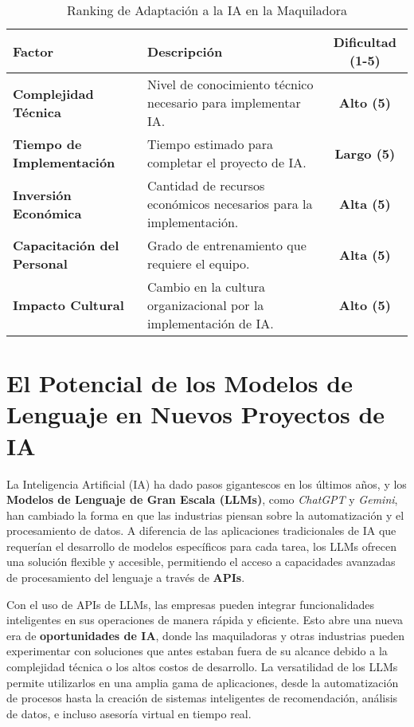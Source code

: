 \begin{table}[htbp]
\centering
\caption{Ranking de Adaptación a la IA en la Maquiladora}
\label{tab:ranking-adaptacion}
\begin{tabularx}{\textwidth}{|X|X|c|}
\hline
\textbf{Factor} & \textbf{Descripción} & \textbf{Dificultad (1-5)} \\
\hline
\textbf{Complejidad Técnica} & Nivel de conocimiento técnico necesario para implementar IA. & \textbf{Alto (5)} \\
\hline
\textbf{Tiempo de Implementación} & Tiempo estimado para completar el proyecto de IA. & \textbf{Largo (5)} \\
\hline
\textbf{Inversión Económica} & Cantidad de recursos económicos necesarios para la implementación. & \textbf{Alta (5)} \\
\hline
\textbf{Capacitación del Personal} & Grado de entrenamiento que requiere el equipo. & \textbf{Alta (5)} \\
\hline
\textbf{Impacto Cultural} & Cambio en la cultura organizacional por la implementación de IA. & \textbf{Alto (5)} \\
\hline
\end{tabularx}
\end{table}








\section{El Potencial de los Modelos de Lenguaje en Nuevos Proyectos de IA}

La Inteligencia Artificial (IA) ha dado pasos gigantescos en los últimos años, y los \textbf{Modelos de Lenguaje de Gran Escala (LLMs)}, como \textit{ChatGPT} y \textit{Gemini}, han cambiado la forma en que las industrias piensan sobre la automatización y el procesamiento de datos. A diferencia de las aplicaciones tradicionales de IA que requerían el desarrollo de modelos específicos para cada tarea, los LLMs ofrecen una solución flexible y accesible, permitiendo el acceso a capacidades avanzadas de procesamiento del lenguaje a través de \textbf{APIs}.

Con el uso de APIs de LLMs, las empresas pueden integrar funcionalidades inteligentes en sus operaciones de manera rápida y eficiente. Esto abre una nueva era de \textbf{oportunidades de IA}, donde las maquiladoras y otras industrias pueden experimentar con soluciones que antes estaban fuera de su alcance debido a la complejidad técnica o los altos costos de desarrollo. La versatilidad de los LLMs permite utilizarlos en una amplia gama de aplicaciones, desde la automatización de procesos hasta la creación de sistemas inteligentes de recomendación, análisis de datos, e incluso asesoría virtual en tiempo real.

